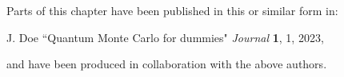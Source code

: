 Parts of this chapter have been published in this or similar form in:

J. Doe ``Quantum Monte Carlo for dummies" \textit{Journal} \textbf{1}, 1, 2023, 

and have been produced in collaboration with the above authors.

\hrulefill 







